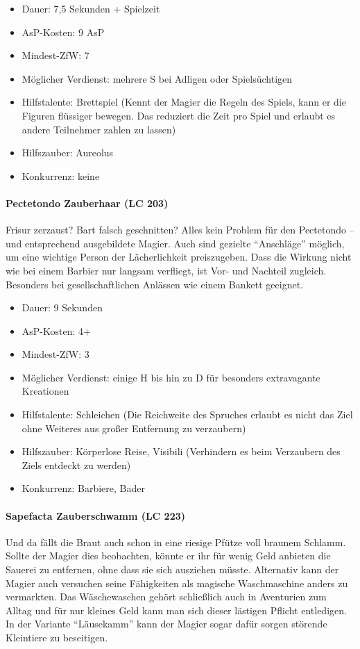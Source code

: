 \begin{itemize}
	\item Dauer: 7,5 Sekunden + Spielzeit
	\item AsP-Kosten: 9 AsP
	\item Mindest-ZfW: 7
	\item Möglicher Verdienst: mehrere S bei Adligen oder Spielsüchtigen
	\item Hilfstalente: Brettspiel (Kennt der Magier die Regeln des Spiels, kann er die Figuren flüssiger bewegen. Das reduziert die Zeit pro Spiel und erlaubt es andere Teilnehmer zahlen zu lassen)
	\item Hilfszauber: Aureolus
	\item Konkurrenz: keine
\end{itemize}

\paragraph{Pectetondo Zauberhaar (LC 203)}
Frisur zerzaust? Bart falsch geschnitten? Alles kein Problem für den Pectetondo -- und entsprechend ausgebildete Magier. Auch sind gezielte \enquote{Anschläge} möglich, um eine wichtige Person der Lächerlichkeit preiszugeben. Dass die Wirkung nicht wie bei einem Barbier nur langsam verfliegt, ist Vor- und Nachteil zugleich. Besonders bei gesellschaftlichen Anlässen wie einem Bankett geeignet.

\begin{itemize}
	\item Dauer: 9 Sekunden
	\item AsP-Kosten: 4+
	\item Mindest-ZfW: 3
	\item Möglicher Verdienst: einige H bis hin zu D für besonders extravagante Kreationen
	\item Hilfstalente: Schleichen (Die Reichweite des Spruches erlaubt es nicht das Ziel ohne Weiteres aus großer Entfernung zu verzaubern)
	\item Hilfszauber: Körperlose Reise, Visibili (Verhindern es beim Verzaubern des Ziels entdeckt zu werden)
	\item Konkurrenz: Barbiere, Bader
\end{itemize}

\paragraph{Sapefacta Zauberschwamm (LC 223)}
Und da fällt die Braut auch schon in eine riesige Pfütze voll braunem Schlamm. Sollte der Magier dies beobachten, könnte er ihr für wenig Geld anbieten die Sauerei zu entfernen, ohne dass sie sich ausziehen müsste. Alternativ kann der Magier auch versuchen seine Fähigkeiten als magische Waschmaschine anders zu vermarkten. Das Wäschewaschen gehört schließlich auch in Aventurien zum Alltag und für nur kleines Geld kann man sich dieser lästigen Pflicht entledigen. In der Variante \enquote{Läusekamm} kann der Magier sogar dafür sorgen störende Kleintiere zu beseitigen.

